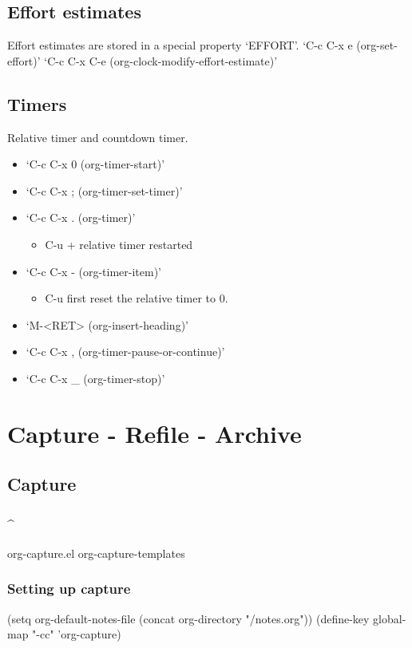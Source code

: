 \documentclass[11pt]{article}
\begin{document}
\subsection{Effort estimates}
\label{sec:org35bebb3}
Effort estimates are stored in a special property ‘EFFORT’.
‘C-c C-x e     (org-set-effort)’
‘C-c C-x C-e     (org-clock-modify-effort-estimate)’
\subsection{Timers}
\label{sec:org46f5868}
Relative timer and countdown timer.
\begin{itemize}
\item ‘C-c C-x 0     (org-timer-start)’
\item ‘C-c C-x ;     (org-timer-set-timer)’
\item ‘C-c C-x .     (org-timer)’
\begin{itemize}
\item C-u + relative timer restarted
\end{itemize}
\item ‘C-c C-x -     (org-timer-item)’
\begin{itemize}
\item C-u first reset the relative timer to 0.
\end{itemize}
\item ‘M-<RET>     (org-insert-heading)’
\item ‘C-c C-x ,     (org-timer-pause-or-continue)’
\item ‘C-c C-x \_     (org-timer-stop)’
\end{itemize}
\section{Capture - Refile - Archive}
\label{sec:orgaa48992}
\subsection{Capture}
\label{sec:org78cb416}
\subsubsection{\^{}}
\label{sec:org7692ac2}
org-capture.el org-capture-templates
\subsubsection{Setting up capture}
\label{sec:org84d9b94}
(setq org-default-notes-file (concat org-directory "/notes.org"))
(define-key global-map "\C-cc" 'org-capture)
\end{document}

